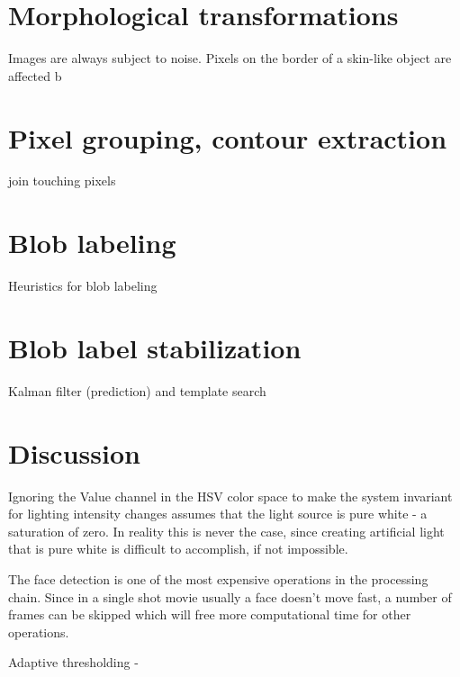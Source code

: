 \section{Morphological transformations}
Images are always subject to noise. 	Pixels on the border of a skin-like object are affected b


\section{Pixel grouping, contour extraction}
join touching pixels

\section{Blob labeling}
Heuristics for blob labeling

\section{Blob label stabilization}
Kalman filter (prediction) and template search

\section{Discussion}
Ignoring the Value channel in the HSV color space to make the system invariant for lighting intensity changes assumes that the light source is pure white - a saturation of zero. In reality this is never the case, since creating artificial light that is pure white is difficult to accomplish, if not impossible.

The face detection is one of the most expensive operations in the processing chain. Since in a single shot movie usually a face doesn't move fast, a number of frames can be skipped which will free more computational time for other operations.

Adaptive thresholding - 

